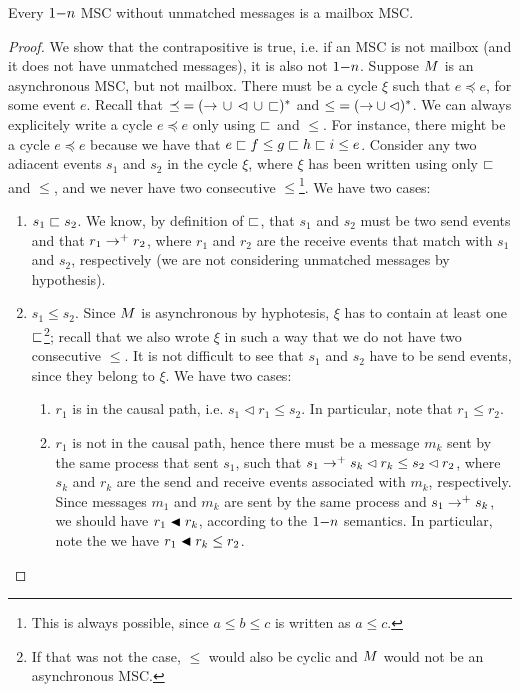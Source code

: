 \begin{proposition}%
	Every $1\mathsf{-}n$ MSC without unmatched messages is a mailbox MSC.
\end{proposition}
\begin{proof}
We show that the contrapositive is true, i.e. if an MSC is not mailbox (and it does not have unmatched messages), it is also not $1\mathsf{-}n$. Suppose $M$ is an asynchronous MSC, but not mailbox. There must be a cycle $\xi$ such that  $e \preceq e$, for some event $e$. Recall that ${\preceq} = ({\to} \,\cup\, {\lhd} \,\cup\, {\sqsubset})^\ast$ and ${\le} = ({\to} \cup {\lhd})^\ast$. We can always explicitely write a cycle $e \preceq e$ only using $\sqsubset$ and $\le$. For instance, there might be a cycle $e \preceq e$ because we have that $e \sqsubset f \le g \sqsubset h \sqsubset i \le e$. Consider any two adiacent events $s_1$ and $s_2$ in the cycle $\xi$, where $\xi$ has been written using only $\sqsubset$ and $\le$, and we never have two consecutive $\le$\footnote{This is always possible, since $a \le b \le c$ is written as $a \le c$.}. We have two cases:
\begin{enumerate}
	\item $s_1 \sqsubset s_2$. We know, by definition of $\sqsubset$, that $s_1$ and $s_2$ must be two send events and that $r_1 \to^+ r_2$, where $r_1$ and $r_2$ are the receive events that match with $s_1$ and $s_2$, respectively (we are not considering unmatched messages by hypothesis).
	\item $s_1 \le s_2$. Since $M$ is asynchronous by hyphotesis, $\xi$ has to contain at least one $\sqsubset$\footnote{If that was not the case, $\le$ would also be cyclic and $M$ would not be an asynchronous MSC.}; recall that we also wrote $\xi$ in such a way that we do not have two consecutive $\le$. It is not difficult to see that $s_1$ and $s_2$ have to be send events, since they belong to $\xi$. We have two cases:
	\begin{enumerate}
		\item $r_1$ is in the causal path, i.e. $s_1 \lhd r_1 \le s_2$. In particular, note that $r_1 \le r_2$.
		\item $r_1$ is not in the causal path, hence there must be a message $m_k$ sent by the same process that sent $s_1$, such that $s_1 \to^+ s_k \lhd r_k \le s_2 \lhd r_2$, where $s_k$ and $r_k$ are the send and receive events associated with $m_k$, respectively. Since messages $m_1$ and $m_k$ are sent by the same process and $s_1 \to^+ s_k$, we should have $r_1 \blacktriangleleft r_k$, according to the $1\mathsf{-}n$ semantics. In particular, note the we have $r_1 \blacktriangleleft r_k \le r_2$.

\end{enumerate}
\end{enumerate}
\end{proof}
